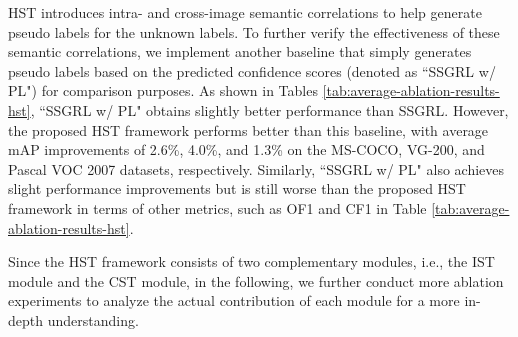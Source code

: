 HST introduces intra- and cross-image semantic correlations to help generate pseudo labels for the unknown labels. To further verify the effectiveness of these semantic correlations, we implement another baseline that simply generates pseudo labels based on the predicted confidence scores (denoted as ``SSGRL w/ PL") for comparison purposes. As shown in Tables \ref{tab:average-ablation-results-hst}, ``SSGRL w/ PL" obtains slightly better performance than SSGRL. However, the proposed HST framework performs better than this baseline, with average mAP improvements of 2.6\%, 4.0\%, and 1.3\% on the MS-COCO, VG-200, and Pascal VOC 2007 datasets, respectively. Similarly, ``SSGRL w/ PL" also achieves slight performance improvements but is still worse than the proposed HST framework in terms of other metrics, such as OF1 and CF1 in Table \ref{tab:average-ablation-results-hst}.

Since the HST framework consists of two complementary modules, i.e., the IST module and the CST module, in the following, we further conduct more ablation experiments to analyze the actual contribution of each module for a more in-depth understanding.

